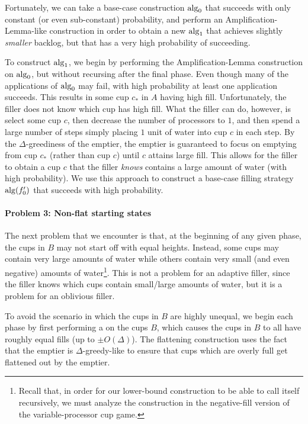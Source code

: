 Fortunately, we can take a base-case construction $\operatorname{\text{\textup{alg}}}_0$ that
succeeds with only constant (or even sub-constant) probability, and
perform an Amplification-Lemma-like construction in order to obtain a
new $\operatorname{\text{\textup{alg}}}_1$ that achieves slightly \emph{smaller} backlog, but
that has a very high probability of succeeding.

To construct $\operatorname{\text{\textup{alg}}}_1$, we begin by performing the
Amplification-Lemma construction on $\operatorname{\text{\textup{alg}}}_0$, but without
recursing after the final phase. Even though many of the
applications of $\operatorname{\text{\textup{alg}}}_0$ may fail, with high probability at least
one application succeeds. This results in some cup $c_*$ in $A$
having high fill. Unfortunately, the filler does not know which
cup has high fill. What the filler can do, however, is select
some cup $c$, then decrease the number of processors to $1$, and
then spend a large number of steps simply placing $1$ unit of
water into cup $c$ in each step. By the $\Delta$-greediness of
the emptier, the emptier is guaranteed to focus on emptying from
cup $c_*$ (rather than cup $c$) until $c$ attains large fill.
This allows for the filler to obtain a cup $c$ that the filler
\emph{knows} contains a large amount of water (with high
probability). We use this approach to construct a base-case
filling strategy $\operatorname{\text{\textup{alg}}}(f_0')$ that succeeds with high
probability.

\paragraph{Problem 3: Non-flat starting states}
The next problem that we encounter is that, at the beginning of any
given phase, the cups in $B$ may not start off with equal
heights. Instead, some cups may contain very large amounts of water
while others contain very small (and even negative) amounts of
water\footnote{Recall that, in order for our lower-bound construction to be able to call itself recursively, we must analyze the construction in the negative-fill version of the variable-processor cup game.}. This is not a problem for an adaptive filler, since the filler
knows which cups contain small/large amounts of water, but it is a
problem for an oblivious filler.

To avoid the scenario in which the cups in $B$ are highly unequal, we
begin each phase by first performing a 
on the cups $B$, which causes the cups in $B$ to all have roughly
equal fills (up to $\pm O(\Delta)$). The flattening construction uses
the fact that the emptier is $\Delta$-greedy-like to ensure that cups
which are overly full get flattened out by the emptier.

